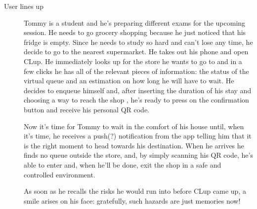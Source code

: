 \begin{description}
    \item[User lines up] 
    Tommy is a student and he’s preparing different exams for the upcoming session.
    He needs to go grocery shopping because he just noticed that his fridge is empty. Since he needs to study so hard and can't lose any time, he decide to go to the nearest supermarket. He takes out his phone and open CLup. He immediately looks up for the store he wants to go to and in a few clicks he has all of the relevant pieces of information: the status of the virtual queue and an estimation on how long he will have to wait.  He decides to enqueue himself and, after inserting the duration of his stay and choosing a way to reach the shop , he's ready to press on the confirmation button and receive his personal QR code. 

    Now it's time for Tommy to wait in the comfort of his house until, when it’s time, he receives a push(?) notification from the app telling him that it is the right moment to head towards his destination. When he arrives he finds no queue outside the store, and, by simply scanning his QR code, he's able to enter and, when he’ll be done, exit the shop in a safe and controlled environment.

    As soon as he recalls the risks he would run into before CLup came up, a smile arises on his face: gratefully, such hazards are just memories now!



\end{description}
